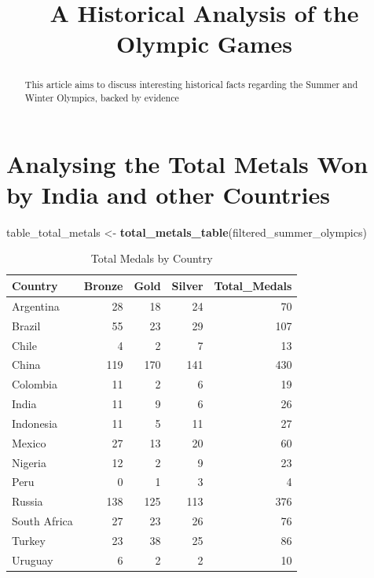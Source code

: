 \documentclass[
  12pt,
]{elsarticle}
\title{A Historical Analysis of the Olympic Games}
\author{}
\date{\vspace{-2.5em}}
\newenvironment{Shaded}{\begin{snugshade}}{\end{snugshade}}
\newcommand{\FunctionTok}[1]{\textcolor[rgb]{0.13,0.29,0.53}{\textbf{#1}}}
\newcommand{\NormalTok}[1]{#1}
\newcommand{\OtherTok}[1]{\textcolor[rgb]{0.56,0.35,0.01}{#1}}
\begin{document}
\maketitle
\begin{abstract}
This article aims to discuss interesting historical facts regarding the
Summer and Winter Olympics, backed by evidence
\end{abstract}

\hypertarget{analysing-the-total-metals-won-by-india-and-other-countries}{%
\section{Analysing the Total Metals Won by India and other
Countries}\label{analysing-the-total-metals-won-by-india-and-other-countries}}

\begin{Shaded}
\begin{Highlighting}[]
\NormalTok{table\_total\_metals }\OtherTok{\textless{}{-}} \FunctionTok{total\_metals\_table}\NormalTok{(filtered\_summer\_olympics)}
\end{Highlighting}
\end{Shaded}

\begingroup\fontsize{11pt}{12pt}\selectfont
\begin{longtable}{lrrrr}
\caption{Total Medals by Country \label{tab:total_medals}} \\ 
  \toprule
Country & Bronze & Gold & Silver & Total\_Medals \\ 
  \midrule
Argentina &  28 &  18 &  24 &  70 \\ 
  Brazil &  55 &  23 &  29 & 107 \\ 
  Chile &   4 &   2 &   7 &  13 \\ 
  China & 119 & 170 & 141 & 430 \\ 
  Colombia &  11 &   2 &   6 &  19 \\ 
  India &  11 &   9 &   6 &  26 \\ 
  Indonesia &  11 &   5 &  11 &  27 \\ 
  Mexico &  27 &  13 &  20 &  60 \\ 
  Nigeria &  12 &   2 &   9 &  23 \\ 
  Peru &   0 &   1 &   3 &   4 \\ 
  Russia & 138 & 125 & 113 & 376 \\ 
  South Africa &  27 &  23 &  26 &  76 \\ 
  Turkey &  23 &  38 &  25 &  86 \\ 
  Uruguay &   6 &   2 &   2 &  10 \\ 
   \bottomrule
\end{longtable}
\endgroup
\end{document}
